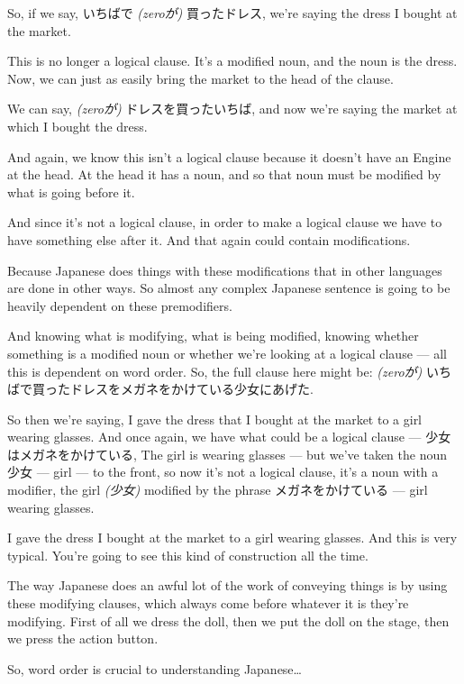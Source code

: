 So, if we say, いちばで {\em (zeroが)} 買ったドレス, we're saying the dress I bought at the market.

{}

This is no longer a logical clause. It's a modified noun, and the noun is the dress. Now, we can just as easily bring the market to the head of the clause.

We can say, {\em (zeroが)} ドレスを買ったいちば, and now we're saying the market at which I bought the dress.

{}

And again, we know this isn't a logical clause because it doesn't have an Engine at the head. At the head it has a noun, and so that noun must be modified by what is going before it.

And since it's not a logical clause, in order to make a logical clause we have to have something else after it. And that again could contain modifications.

Because Japanese does things with these modifications that in other languages are done in other ways. So almost any complex Japanese sentence is going to be heavily dependent on these premodifiers.

And knowing what is modifying, what is being modified, knowing whether something is a modified noun or whether we're looking at a logical clause --- all this is dependent on word order. So, the full clause here might be: {\em (zeroが)} いちばで買ったドレスをメガネをかけている少女にあげた.

{}

So then we're saying, I gave the dress that I bought at the market to a girl wearing glasses. And once again, we have what could be a logical clause --- 少女はメガネをかけている, The girl is wearing glasses --- but we've taken the noun 少女 --- girl --- to the front, so now it's not a logical clause, it's a noun with a modifier, the girl {\em (少女)} modified by the phrase メガネをかけている --- girl wearing glasses.

I gave the dress I bought at the market to a girl wearing glasses. And this is very typical. You're going to see this kind of construction all the time.

The way Japanese does an awful lot of the work of conveying things is by using these modifying clauses, which always come before whatever it is they're modifying. First of all we dress the doll, then we put the doll on the stage, then we press the action button.

So, word order is crucial to understanding Japanese\ldots{}

\stopsectionlevel

\stopsectionlevel

\stopsectionlevel
